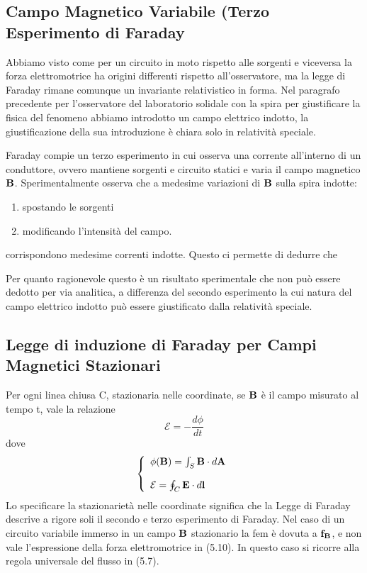 \subsection{Campo Magnetico Variabile (Terzo Esperimento di Faraday}

Abbiamo visto come per un circuito in moto rispetto alle sorgenti e viceversa la forza elettromotrice ha origini differenti rispetto all'osservatore, ma la legge di Faraday rimane comunque un invariante relativistico in forma. Nel paragrafo precedente per l'osservatore del laboratorio solidale con la spira per giustificare la fisica del fenomeno abbiamo introdotto un campo elettrico indotto, la giustificazione della sua introduzione \`e chiara solo in relativit\`a speciale.

Faraday compie un terzo esperimento in cui osserva una corrente all'interno di un conduttore, ovvero mantiene sorgenti e circuito statici e varia il campo magnetico $\bold{B}$. Sperimentalmente osserva che a medesime variazioni di $\bold{B}$ sulla spira indotte:
\begin{enumerate}
	\item spostando le sorgenti 
	\item modificando l'intensit\`a del campo.
\end{enumerate} 
corrispondono medesime correnti indotte. Questo ci permette di dedurre che 
\begin{center}
\end{center}
Per quanto ragionevole questo \`e un risultato sperimentale che non pu\`o essere dedotto per via analitica, a differenza del secondo esperimento la cui natura del campo elettrico indotto pu\`o essere giustificato dalla relativit\`a speciale.

\subsection{Legge di induzione di Faraday per Campi Magnetici Stazionari}

Per ogni linea chiusa C, stazionaria nelle coordinate,  se $\bold{B}$ \`e il campo misurato al tempo t, vale la relazione 
\begin{equation*}
	\mathcal{E} = - \frac{d\phi}{dt}
\end{equation*}
dove 
\begin{align}
	\left \{ \begin{array}{l}
		\phi(\bold{B}) = \int_{S} \bold{B} \cdot d\bold{A} \\ \rule{0pt}{20pt}
		\mathcal{E} = \oint_C \bold{E} \cdot d \bold{l}
	\end{array}\right .
\end{align} 
Lo specificare la stazionariet\`a nelle coordinate significa che la Legge di Faraday descrive a rigore soli il secondo e terzo esperimento di Faraday. Nel caso di un circuito variabile immerso in un campo $\bold{B}$ stazionario la fem \`e dovuta a $\bold{f_B}$, e non vale l'espressione della forza elettromotrice in (5.10). In questo caso si ricorre alla regola universale del flusso in (5.7).

